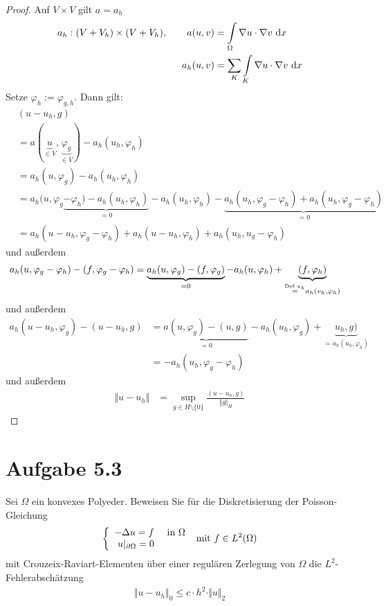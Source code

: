 \documentclass[12pt,a4paper]{article}
\begin{document}
\begin{proof}
Auf $V\times V$ gilt $a=a_h$
\begin{align*}
a_h:(V+V_h)\times(V+V_h),\qquad
a(u,v)&=\int\limits_\Omega\nabla u\cdot\nabla v\d x\\
a_h(u,v)&=\sum\limits_{K}\int\limits_K\nabla u\cdot\nabla v\d x
\end{align*}
Setze $\varphi_h:=\varphi_{g,h}$. Dann gilt:
\begin{align*}
&(u-u_h,g)\\
&=a(\underbrace{u}_{\in V},\underbrace{\varphi_g}_{\in V})-a_h(u_h,\varphi_h)\\
&=a_h(u,\varphi_g)-a_h(u_h,\varphi_h)\\
&=a_h(u,\varphi_g\underbrace{-\varphi_h)-a_h(u_h,\varphi_h)}_{=0}-a_h(u_h,\varphi_h)-\underbrace{a_h(u_h,\varphi_g-\varphi_h)+a_h(u_h,\varphi_g-\varphi_h)}_{=0}\\
&=a_h(u-u_h,\varphi_g-\varphi_h)+a_h(u-u_h,\varphi_h)+a_h(u_h,u_g-\varphi_h)
\end{align*}
und außerdem
\begin{align*}
a_h(u,\varphi_g-\varphi_h)-(f,\varphi_g-\varphi_h)
&=\underbrace{a_h(u,\varphi_g)-(f,\varphi_g)}_{=0}-a_h(u,\varphi_h)+\underbrace{(f,\varphi_h)}_{\stackeq{\text{Def }u_h}a_h(v_h,\varphi_h)}
\end{align*}
und außerdem %
\begin{align*}
a_h(u-u_h,\varphi_g)-(u-u_h,g)
&=\underbrace{a(u,\varphi_g)-(u,g)}_{=0}-a_h(u_h,\varphi_g)+\underbrace{u_h,g)}_{=a_h(u_h,\varphi_h)}\\
&=-a_h(u_h,\varphi_g-\varphi_h)
\end{align*}
und außerdem %
\begin{align*}
\Vert u-u_h\Vert
&=\sup\limits_{g\in H\setminus\lbrace0\rbrace}\frac{(u-u_h,g)}{\Vert g\Vert_H}
\end{align*}
\end{proof}

\section*{Aufgabe 5.3}
Sei $\Omega$ ein konvexes Polyeder. Beweisen Sie für die Diskretisierung der Poisson-Gleichung
\begin{align*}
\left\lbrace\begin{array}{rl}
-\Delta u=f &\text{ in }\Omega\\
u|_{\partial\Omega}=0
\end{array}\right.\mit f\in L^2(\Omega)
\end{align*}
mit Crouzeix-Raviart-Elementen über einer regulären Zerlegung von $\Omega$ die $L^2$-Fehlerabschätzung
\begin{align*}
\Vert u-u_h\Vert_0\leq c\cdot h^2\cdot\Vert u\Vert_2
\end{align*}
\end{document}
